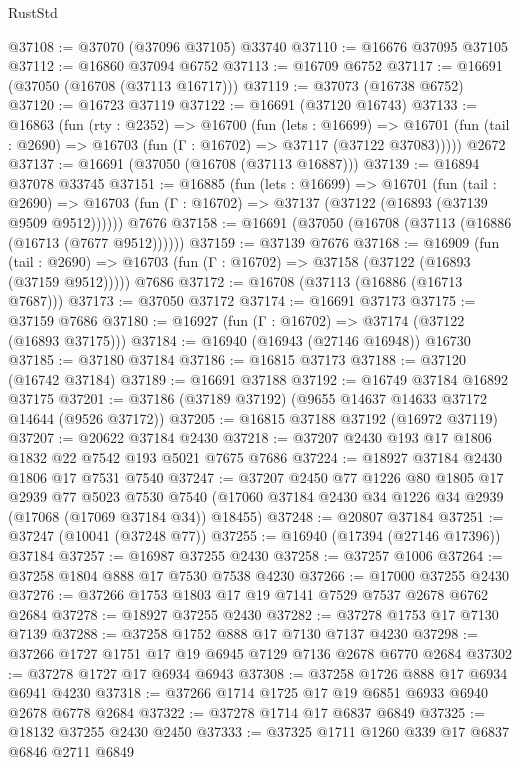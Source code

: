 \begin{lexlean}{RustStd}
\begin{coremodule}
@37108 := @37070 (@37096 @37105) @33740
@37110 := @16676 @37095 @37105
@37112 := @16860 @37094 @6752
@37113 := @16709 @6752
@37117 := @16691 (@37050 (@16708 (@37113 @16717)))
@37119 := @37073 (@16738 @6752)
@37120 := @16723 @37119
@37122 := @16691 (@37120 @16743)
@37133 := @16863
    (fun (rty : @2352) =>
    @16700
      (fun (lets : @16699) =>
      @16701 (fun (tail : @2690) => @16703 (fun (Γ : @16702) => @37117 (@37122 @37083)))))
    @2672
@37137 := @16691 (@37050 (@16708 (@37113 @16887)))
@37139 := @16894 @37078 @33745
@37151 := @16885
    (fun (lets : @16699) =>
    @16701
      (fun (tail : @2690) =>
      @16703 (fun (Γ : @16702) => @37137 (@37122 (@16893 (@37139 @9509 @9512))))))
    @7676
@37158 := @16691 (@37050 (@16708 (@37113 (@16886 (@16713 (@7677 @9512))))))
@37159 := @37139 @7676
@37168 := @16909
    (fun (tail : @2690) => @16703 (fun (Γ : @16702) => @37158 (@37122 (@16893 (@37159 @9512)))))
    @7686
@37172 := @16708 (@37113 (@16886 (@16713 @7687)))
@37173 := @37050 @37172
@37174 := @16691 @37173
@37175 := @37159 @7686
@37180 := @16927 (fun (Γ : @16702) => @37174 (@37122 (@16893 @37175)))
@37184 := @16940 (@16943 (@27146 @16948)) @16730
@37185 := @37180 @37184
@37186 := @16815 @37173
@37188 := @37120 (@16742 @37184)
@37189 := @16691 @37188
@37192 := @16749 @37184 @16892 @37175
@37201 := @37186 (@37189 @37192) (@9655 @14637 @14633 @37172 @14644 (@9526 @37172))
@37205 := @16815 @37188 @37192 (@16972 @37119)
@37207 := @20622 @37184 @2430
@37218 := @37207 @2430 @193 @17 @1806 @1832 @22 @7542 @193 @5021 @7675 @7686
@37224 := @18927 @37184 @2430 @1806 @17 @7531 @7540
@37247 := @37207
    @2450
    @77
    @1226
    @80
    @1805
    @17
    @2939
    @77
    @5023
    @7530
    @7540
    (@17060 @37184 @2430 @34 @1226 @34 @2939 (@17068 (@17069 @37184 @34)) @18455)
@37248 := @20807 @37184
@37251 := @37247 (@10041 (@37248 @77))
@37255 := @16940 (@17394 (@27146 @17396)) @37184
@37257 := @16987 @37255 @2430
@37258 := @37257 @1006
@37264 := @37258 @1804 @888 @17 @7530 @7538 @4230
@37266 := @17000 @37255 @2430
@37276 := @37266 @1753 @1803 @17 @19 @7141 @7529 @7537 @2678 @6762 @2684
@37278 := @18927 @37255 @2430
@37282 := @37278 @1753 @17 @7130 @7139
@37288 := @37258 @1752 @888 @17 @7130 @7137 @4230
@37298 := @37266 @1727 @1751 @17 @19 @6945 @7129 @7136 @2678 @6770 @2684
@37302 := @37278 @1727 @17 @6934 @6943
@37308 := @37258 @1726 @888 @17 @6934 @6941 @4230
@37318 := @37266 @1714 @1725 @17 @19 @6851 @6933 @6940 @2678 @6778 @2684
@37322 := @37278 @1714 @17 @6837 @6849
@37325 := @18132 @37255 @2430 @2450
@37333 := @37325 @1711 @1260 @339 @17 @6837 @6846 @2711 @6849

\end{coremodule}
\end{lexlean}
